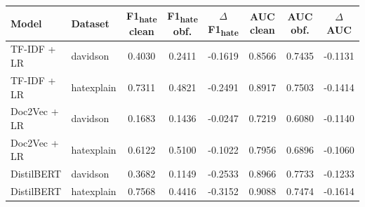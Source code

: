\begin{tabular}{llcccccc}
\toprule
Model & Dataset & F1\textsubscript{hate} clean & F1\textsubscript{hate} obf. & $\Delta$ F1\textsubscript{hate} & AUC clean & AUC obf. & $\Delta$ AUC \\
\midrule
TF-IDF + LR & davidson & 0.4030 & 0.2411 & -0.1619 & 0.8566 & 0.7435 & -0.1131 \\
TF-IDF + LR & hatexplain & 0.7311 & 0.4821 & -0.2491 & 0.8917 & 0.7503 & -0.1414 \\
Doc2Vec + LR & davidson & 0.1683 & 0.1436 & -0.0247 & 0.7219 & 0.6080 & -0.1140 \\
Doc2Vec + LR & hatexplain & 0.6122 & 0.5100 & -0.1022 & 0.7956 & 0.6896 & -0.1060 \\
DistilBERT & davidson & 0.3682 & 0.1149 & -0.2533 & 0.8966 & 0.7733 & -0.1233 \\
DistilBERT & hatexplain & 0.7568 & 0.4416 & -0.3152 & 0.9088 & 0.7474 & -0.1614 \\
\bottomrule
\end{tabular}

